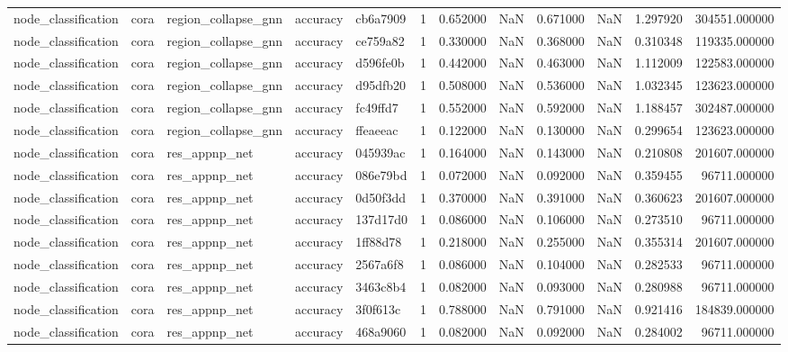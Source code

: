 \begin{tabular}{lllllrrrrrrr}
node_classification & cora & region_collapse_gnn & accuracy & cb6a7909 & 1 & 0.652000 & NaN & 0.671000 & NaN & 1.297920 & 304551.000000 \\
node_classification & cora & region_collapse_gnn & accuracy & ce759a82 & 1 & 0.330000 & NaN & 0.368000 & NaN & 0.310348 & 119335.000000 \\
node_classification & cora & region_collapse_gnn & accuracy & d596fe0b & 1 & 0.442000 & NaN & 0.463000 & NaN & 1.112009 & 122583.000000 \\
node_classification & cora & region_collapse_gnn & accuracy & d95dfb20 & 1 & 0.508000 & NaN & 0.536000 & NaN & 1.032345 & 123623.000000 \\
node_classification & cora & region_collapse_gnn & accuracy & fc49ffd7 & 1 & 0.552000 & NaN & 0.592000 & NaN & 1.188457 & 302487.000000 \\
node_classification & cora & region_collapse_gnn & accuracy & ffeaeeac & 1 & 0.122000 & NaN & 0.130000 & NaN & 0.299654 & 123623.000000 \\
node_classification & cora & res_appnp_net & accuracy & 045939ac & 1 & 0.164000 & NaN & 0.143000 & NaN & 0.210808 & 201607.000000 \\
node_classification & cora & res_appnp_net & accuracy & 086e79bd & 1 & 0.072000 & NaN & 0.092000 & NaN & 0.359455 & 96711.000000 \\
node_classification & cora & res_appnp_net & accuracy & 0d50f3dd & 1 & 0.370000 & NaN & 0.391000 & NaN & 0.360623 & 201607.000000 \\
node_classification & cora & res_appnp_net & accuracy & 137d17d0 & 1 & 0.086000 & NaN & 0.106000 & NaN & 0.273510 & 96711.000000 \\
node_classification & cora & res_appnp_net & accuracy & 1ff88d78 & 1 & 0.218000 & NaN & 0.255000 & NaN & 0.355314 & 201607.000000 \\
node_classification & cora & res_appnp_net & accuracy & 2567a6f8 & 1 & 0.086000 & NaN & 0.104000 & NaN & 0.282533 & 96711.000000 \\
node_classification & cora & res_appnp_net & accuracy & 3463c8b4 & 1 & 0.082000 & NaN & 0.093000 & NaN & 0.280988 & 96711.000000 \\
node_classification & cora & res_appnp_net & accuracy & 3f0f613c & 1 & 0.788000 & NaN & 0.791000 & NaN & 0.921416 & 184839.000000 \\
node_classification & cora & res_appnp_net & accuracy & 468a9060 & 1 & 0.082000 & NaN & 0.092000 & NaN & 0.284002 & 96711.000000 \\

\end{tabular}
